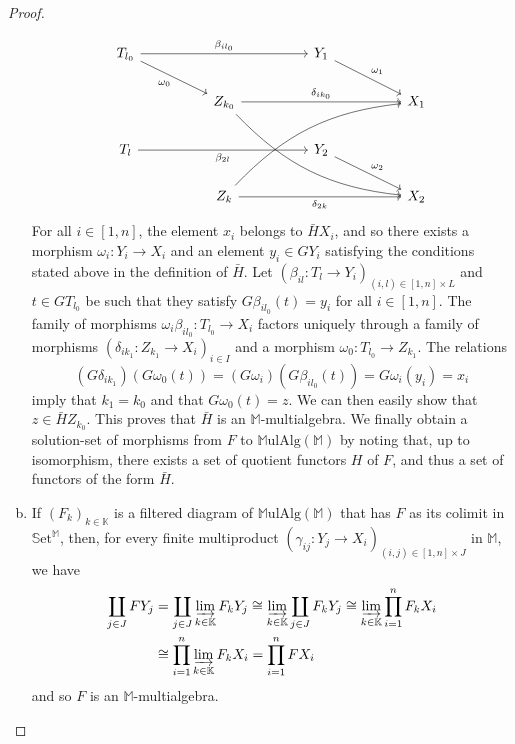 \documentclass{article}
\newcommand{\bb}[1]{{\mathbb{#1}}}
\newcommand{\Set}{\mathbb{S}\mathrm{et}}
\newcommand{\MulAlg}{\mathbb{M}\mathrm{ulAlg}}
\newcommand{\oldpage}[1]{\marginpar{\footnotesize$\Big\vert$ \textit{p.~#1}}}
\begin{document}
\begin{proof}
\begin{enumerate}[a)]
\oldpage{198}
      \[
        \begin{tikzcd}[column sep=huge]
          T_{l_0} \ar[rr,"\beta_{il_0}"] \ar[dr,swap,"\omega_0"]
          && Y_1 \ar[dr,"\omega_1"]
        \\&Z_{k_0} \ar[rr,"\delta_{ik_0}"] \ar[ddrr,bend right=20]
          && X_1
        \\T_l \ar[rr,swap,"\beta_{2l}"]
          && Y_2 \ar[dr,"\omega_2"]
        \\&Z_k \ar[rr,swap,"\delta_{2k}"] \ar[uurr,bend left=20]
          && X_2
        \end{tikzcd}
      \]
      For all $i\in[1,n]$, the element $x_i$ belongs to $\bar{H}X_i$, and so there exists a morphism $\omega_i\colon Y_i\to X_i$ and an element $y_i\in GY_i$ satisfying the conditions stated above in the definition of $\bar{H}$.
      Let $(\beta_{il}\colon T_l\to Y_i)_{(i,l)\in[1,n]\times L}$ and $t\in GT_{l_0}$ be such that they satisfy $G\beta_{il_0}(t)=y_i$ for all $i\in[1,n]$.
      The family of morphisms $\omega_i\beta_{il_0}\colon T_{l_0}\to X_i$ factors uniquely through a family of morphisms $(\delta_{ik_1}\colon Z_{k_1}\to X_i)_{i\in I}$ and a morphism $\omega_0\colon T_{l_0}\to Z_{k_1}$.
      The relations
      \[
        (G\delta_{ik_1})(G\omega_0(t))
        = (G\omega_i)(G\beta_{il_0}(t))
        = G\omega_i(y_i)
        = x_i
      \]
      imply that $k_1=k_0$ and that $G\omega_0(t)=z$.
      We can then easily show that $z\in\bar{H}Z_{k_0}$.
      This proves that $\bar{H}$ is an $\bb{M}$-multialgebra.
      We finally obtain a solution-set of morphisms from $F$ to $\MulAlg(\bb{M})$ by noting that, up to isomorphism, there exists a set of quotient functors $H$ of $F$, and thus a set of functors of the form $\bar{H}$.
    \item If $(F_k)_{k\in\bb{K}}$ is a filtered diagram of $\MulAlg(\bb{M})$ that has $F$ as its colimit in $\Set^\bb{M}$, then, for every finite multiproduct $(\gamma_{ij}\colon Y_j\to X_i)_{(i,j)\in[1,n]\times J}$ in $\bb{M}$, we have
      \[
        \begin{aligned}
          \coprod_{j\in J} FY_j
          &= \coprod_{j\in J} \varinjlim_{k\in\bb{K}} F_kY_j
          \cong \varinjlim_{k\in\bb{K}} \coprod_{j\in J} F_kY_j
          \cong \varinjlim_{k\in\bb{K}} \prod_{i=1}^n F_kX_i
        \\&\cong \prod_{i=1}^n \varinjlim_{k\in\bb{K}} F_kX_i
          = \prod_{i=1}^n FX_i
        \end{aligned}
      \]
      and so $F$ is an $\bb{M}$-multialgebra.

\end{enumerate}
\end{proof}
\end{document}
